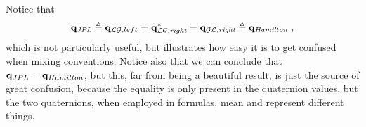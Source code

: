 Notice that
%
\begin{align}
\bfq_{\textit{JPL}}
\triangleq    \bfq_{\cL\cG,left}
=    \bfq_{\cL\cG,\textit{right}}^*
=    \bfq_{\cG\cL,\textit{right}}
\triangleq    \bfq_{\textit{Hamilton}}%
~,
\label{equ:quatEquivalences}
\end{align}
%
which is not particularly useful, but illustrates how easy it is to get confused when mixing conventions.
Notice also that we can conclude that ${\bf q}_{JPL} = {\bf q}_{Hamilton}$, but this, far from being a beautiful result, is just the source of great confusion, 
because the equality is only present in the quaternion values, 
but the two quaternions, when employed in formulas,  mean and represent different things.




%
%
%
%
%
%

